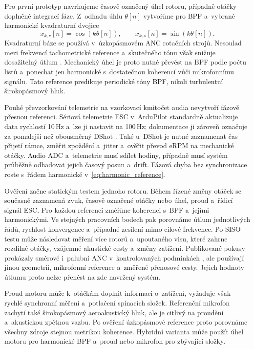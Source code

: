 \documentclass[conference]{IEEEtran}
\begin{document}
Pro první prototyp navrhujeme časově označený úhel rotoru, případně otáčky doplněné integrací fáze. Z~odhadu úhlu $\theta[n]$ vytvoříme pro BPF a~vybrané harmonické kvadraturní dvojice
\begin{equation}
 x_{k,c}[n]=\cos(k\theta[n]),\qquad
 x_{k,s}[n]=\sin(k\theta[n]).
 \label{eq:harmonic_reference}
\end{equation}
Kvadraturní báze se používá v~úzkopásmovém ANC rotačních strojů. Nesoulad mezi frekvencí tachometrické reference a~skutečného tónu však snižuje dosažitelný útlum \cite{xiao2006narrowband}. Mechanický úhel je proto nutné převést na BPF podle počtu listů a~ponechat jen harmonické s~dostatečnou koherencí vůči mikrofonnímu signálu. Tato reference predikuje periodické tóny BPF, nikoli turbulentní širokopásmový hluk.

Pouhé převzorkování telemetrie na vzorkovací kmitočet audia nevytvoří fázově přesnou referenci. Sériová telemetrie ESC v~ArduPilot standardně aktualizuje data rychlostí 10\,Hz a~lze ji nastavit na 100\,Hz; dokumentace ji zároveň označuje za pomalejší než obousměrný DShot \cite{ardupilotEscTelemetry}. Také u~DShot je nutné zaznamenat čas přijetí rámce, změřit zpoždění a~jitter a~ověřit převod eRPM na mechanické otáčky. Audio ADC a~telemetrie musí sdílet hodiny, případně musí systém průběžně odhadovat jejich časový posun a~drift. Fázová chyba bez synchronizace roste s~řádem harmonické v~\eqref{eq:harmonic_reference}.

Ověření začne statickým testem jednoho rotoru. Během řízené změny otáček se současně zaznamená zvuk, časově označené otáčky nebo úhel, proud a~řídicí signál ESC. Pro každou referenci změříme koherenci s~BPF a~jejími harmonickými. Ve stejných pracovních bodech pak porovnáme útlum jednotlivých řádů, rychlost konvergence a~případné zesílení mimo cílové frekvence. Po SISO testu může následovat měření více rotorů a~upoutaného visu, které zahrne rozdílné otáčky, vzájemné akustické cesty a~změny zatížení. Publikované pokusy prokázaly směrové i~palubní ANC v~kontrolovaných podmínkách \cite{bi2025directional,steiner2026drone}, ale používají jinou geometrii, mikrofonní reference a~změřené přenosové cesty. Jejich hodnoty útlumu proto nelze přenést na zde navržený systém.

Proud motoru může k~otáčkám doplnit informaci o~zatížení, vyžaduje však rychlé synchronní měření a~potlačení spínacích složek. Referenční mikrofon zachytí také širokopásmový aeroakustický hluk, ale je citlivý na proudění a~akustickou zpětnou vazbu. Po ověření úzkopásmové reference proto porovnáme všechny zdroje stejnou metrikou koherence. Hybridní varianta může použít úhel motoru pro harmonické BPF a~proud nebo mikrofon pro zbývající složky.
\end{document}
